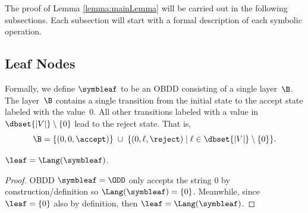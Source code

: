 The proof of Lemma \ref{lemma:mainLemma} will be carried out in the following subsections. Each subsection will start with a formal description of each symbolic operation.


\subsection{Leaf Nodes}


Formally, we define $\symbleaf$ to be an OBDD consisting of a single layer~$\B$.
The layer~$\B$ contains a single transition from the initial state to the accept
state labeled with the value~$0$. All other transitions labeled with a value in
$\dbset{|V|} \setminus \{0\}$ lead to the reject state. That is,
\[
\B
= \{(0,0,\accept)\}
\;\cup\;
\{(0,\ell,\reject) \mid \ell \in \dbset{|V|} \setminus \{0\}\}.
\]






\begin{lemma}
\label{lemma:SymbolicLeaf}
    $\leaf = \Lang(\symbleaf)$. 
\end{lemma}
\begin{proof}
    OBDD $\symbleaf = \ODD$ only accepts the string $0$ by construction/definition so $\Lang(\symbleaf) = \{0\}$. Meanwhile, since $\leaf =  \{0\}$ also by definition, then $\leaf = \Lang(\symbleaf)$.
\end{proof}


